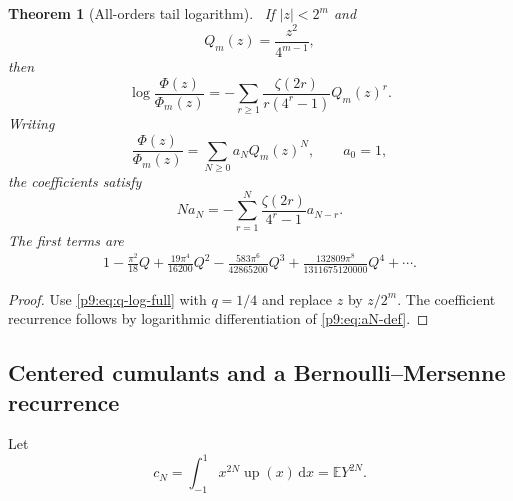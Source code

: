 \documentclass[11pt]{article}
\numberwithin{equation}{section}
\newtheorem{theorem}{Theorem}[section]
\theoremstyle{definition}
\theoremstyle{remark}
\newcommand{\E}{\mathbb E}
\newcommand{\Up}{\operatorname{up}}
\newcommand{\dd}{\,\mathrm d}
\begin{document}
\begin{theorem}[All-orders tail logarithm]\label{p9:thm:tail-log}
\statusN\ If $|z|<2^m$ and
\begin{equation}
 Q_m(z)=\frac{z^2}{4^{m-1}},                               \label{p9:eq:Qm}
\end{equation}
then
\begin{equation}
 \boxed{
 \log\frac{\Phi(z)}{\Phi_m(z)}
 =-\sum_{r\ge1}\frac{\zeta(2r)}{r(4^r-1)}Q_m(z)^r.}       \label{p9:eq:tail-log}
\end{equation}
Writing
\begin{equation}
 \frac{\Phi(z)}{\Phi_m(z)}=\sum_{N\ge0}a_NQ_m(z)^N,
 \qquad a_0=1,                                             \label{p9:eq:aN-def}
\end{equation}
the coefficients satisfy
\begin{equation}
 \boxed{
 Na_N=-\sum_{r=1}^{N}\frac{\zeta(2r)}{4^r-1}a_{N-r}.}     \label{p9:eq:aN-rec}
\end{equation}
The first terms are
\begin{align}
 1-\frac{\pi^2}{18}Q
 +\frac{19\pi^4}{16200}Q^2
 -\frac{583\pi^6}{42865200}Q^3
 +\frac{132809\pi^8}{1311675120000}Q^4+\cdots.            \label{p9:eq:tail-first}
\end{align}
\end{theorem}

\begin{proof}
Use \eqref{p9:eq:q-log-full} with $q=1/4$ and replace $z$ by $z/2^m$.
The coefficient recurrence follows by logarithmic differentiation of
\eqref{p9:eq:aN-def}.
\end{proof}

\subsection{Centered cumulants and a Bernoulli--Mersenne recurrence}
Let
\begin{equation}
 c_N=\int_{-1}^{1}x^{2N}\Up(x)\dd x=\E Y^{2N}.             \label{p9:eq:cN}
\end{equation}
\end{document}

